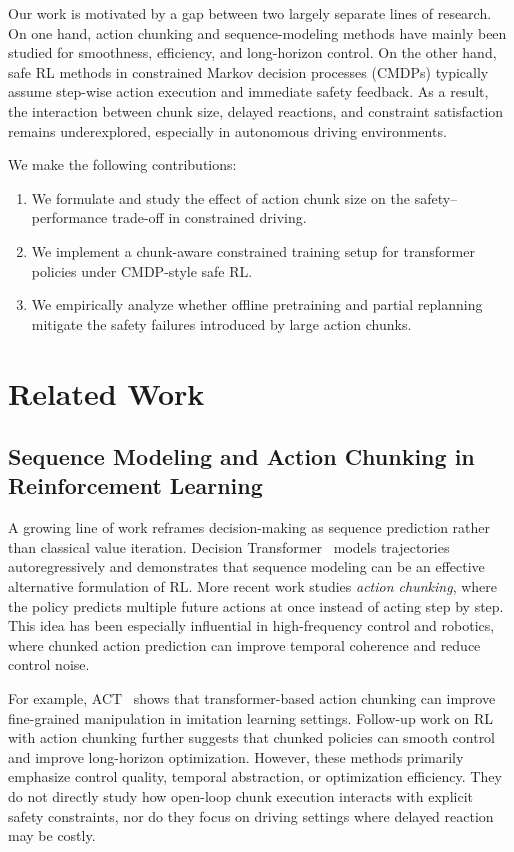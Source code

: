 \documentclass{article}
\begin{document}
Our work is motivated by a gap between two largely separate lines of research. On one hand, action chunking and sequence-modeling methods have mainly been studied for smoothness, efficiency, and long-horizon control. On the other hand, safe RL methods in constrained Markov decision processes (CMDPs) typically assume step-wise action execution and immediate safety feedback. As a result, the interaction between chunk size, delayed reactions, and constraint satisfaction remains underexplored, especially in autonomous driving environments.

We make the following contributions:
\begin{enumerate}
    \item We formulate and study the effect of action chunk size on the safety--performance trade-off in constrained driving.
    \item We implement a chunk-aware constrained training setup for transformer policies under CMDP-style safe RL.
    \item We empirically analyze whether offline pretraining and partial replanning mitigate the safety failures introduced by large action chunks.
\end{enumerate}

\section{Related Work}

\subsection{Sequence Modeling and Action Chunking in Reinforcement Learning}

A growing line of work reframes decision-making as sequence prediction rather than classical value iteration. Decision Transformer~\citep{chen2021decision} models trajectories autoregressively and demonstrates that sequence modeling can be an effective alternative formulation of RL. More recent work studies \emph{action chunking}, where the policy predicts multiple future actions at once instead of acting step by step. This idea has been especially influential in high-frequency control and robotics, where chunked action prediction can improve temporal coherence and reduce control noise.

For example, ACT~\citep{zhao2023act} shows that transformer-based action chunking can improve fine-grained manipulation in imitation learning settings. Follow-up work on RL with action chunking further suggests that chunked policies can smooth control and improve long-horizon optimization. However, these methods primarily emphasize control quality, temporal abstraction, or optimization efficiency. They do not directly study how open-loop chunk execution interacts with explicit safety constraints, nor do they focus on driving settings where delayed reaction may be costly.
\end{document}
